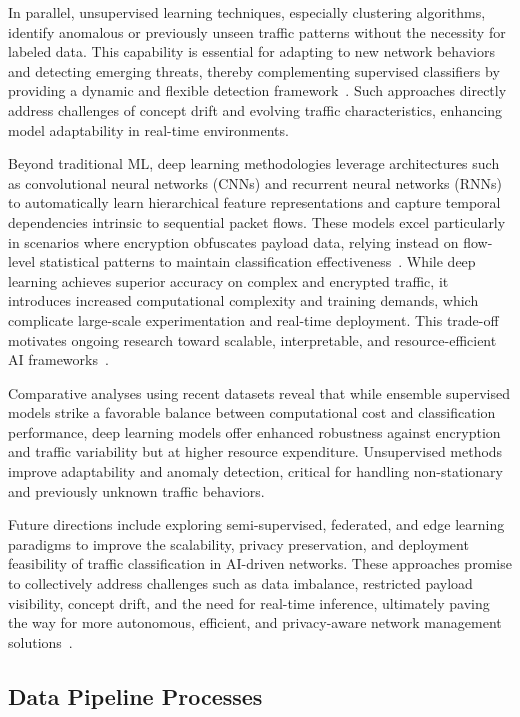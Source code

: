 \documentclass[sigconf]{acmart}
\begin{document}
In parallel, unsupervised learning techniques, especially clustering algorithms, identify anomalous or previously unseen traffic patterns without the necessity for labeled data. This capability is essential for adapting to new network behaviors and detecting emerging threats, thereby complementing supervised classifiers by providing a dynamic and flexible detection framework~\cite{ref51}. Such approaches directly address challenges of concept drift and evolving traffic characteristics, enhancing model adaptability in real-time environments.

Beyond traditional ML, deep learning methodologies leverage architectures such as convolutional neural networks (CNNs) and recurrent neural networks (RNNs) to automatically learn hierarchical feature representations and capture temporal dependencies intrinsic to sequential packet flows. These models excel particularly in scenarios where encryption obfuscates payload data, relying instead on flow-level statistical patterns to maintain classification effectiveness~\cite{ref1,ref6,ref51}. While deep learning achieves superior accuracy on complex and encrypted traffic, it introduces increased computational complexity and training demands, which complicate large-scale experimentation and real-time deployment. This trade-off motivates ongoing research toward scalable, interpretable, and resource-efficient AI frameworks~\cite{ref51}.

Comparative analyses using recent datasets reveal that while ensemble supervised models strike a favorable balance between computational cost and classification performance, deep learning models offer enhanced robustness against encryption and traffic variability but at higher resource expenditure. Unsupervised methods improve adaptability and anomaly detection, critical for handling non-stationary and previously unknown traffic behaviors.

Future directions include exploring semi-supervised, federated, and edge learning paradigms to improve the scalability, privacy preservation, and deployment feasibility of traffic classification in AI-driven networks. These approaches promise to collectively address challenges such as data imbalance, restricted payload visibility, concept drift, and the need for real-time inference, ultimately paving the way for more autonomous, efficient, and privacy-aware network management solutions~\cite{ref51}.

\subsection{Data Pipeline Processes}
\end{document}
